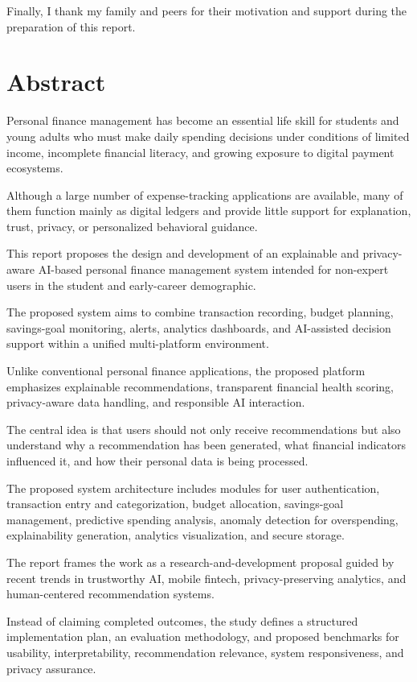 \documentclass[12pt,a4paper]{report}
\begin{document}
Finally,
I thank my family and peers for their motivation and support during the preparation of this report.


\chapter*{Abstract}
\justifying
Personal finance management has become an essential life skill for students and young adults who must make daily spending decisions under conditions of limited income, incomplete financial literacy, and growing exposure to digital payment ecosystems.

Although a large number of expense-tracking applications are available, many of them function mainly as digital ledgers and provide little support for explanation, trust, privacy, or personalized behavioral guidance.

This report proposes the design and development of an explainable and privacy-aware AI-based personal finance management system intended for non-expert users in the student and early-career demographic.

The proposed system aims to combine transaction recording, budget planning, savings-goal monitoring, alerts, analytics dashboards, and AI-assisted decision support within a unified multi-platform environment.

Unlike conventional personal finance applications, the proposed platform emphasizes explainable recommendations, transparent financial health scoring, privacy-aware data handling, and responsible AI interaction.

The central idea is that users should not only receive recommendations but also understand why a recommendation has been generated, what financial indicators influenced it, and how their personal data is being processed.

The proposed system architecture includes modules for user authentication, transaction entry and categorization, budget allocation, savings-goal management, predictive spending analysis, anomaly detection for overspending, explainability generation, analytics visualization, and secure storage.

The report frames the work as a research-and-development proposal guided by recent trends in trustworthy AI, mobile fintech, privacy-preserving analytics, and human-centered recommendation systems.

Instead of claiming completed outcomes, the study defines a structured implementation plan, an evaluation methodology, and proposed benchmarks for usability, interpretability, recommendation relevance, system responsiveness, and privacy assurance.
\end{document}
